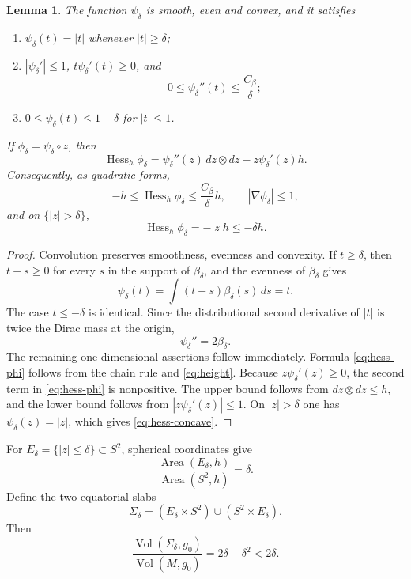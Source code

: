 \documentclass[11pt]{amsart}
\newtheorem{lemma}[theorem]{Lemma}
\theoremstyle{definition}
\newcommand{\Vol}{\operatorname{Vol}}
\newcommand{\Hess}{\operatorname{Hess}}
\begin{document}
\begin{lemma}\label{lem:smoothing}
The function $\psi_\delta$ is smooth, even and convex, and it satisfies
\begin{enumerate}[label=\textup{(\roman*)}]
 \item $\psi_\delta(t)=|t|$ whenever $|t|\ge\delta$;
 \item $|\psi_\delta'|\le1$, $t\psi_\delta'(t)\ge0$, and
 \[
 0\le\psi_\delta''(t)\le\frac{C_\beta}{\delta};
 \]
 \item $0\le\psi_\delta(t)\le1+\delta$ for $|t|\le1$.
\end{enumerate}
If $\phi_\delta=\psi_\delta\circ z$, then
\begin{equation}\label{eq:hess-phi}
 \Hess_h\phi_\delta
 =\psi_\delta''(z)\,dz\otimes dz-z\psi_\delta'(z)h.
\end{equation}
Consequently, as quadratic forms,
\begin{equation}\label{eq:hess-global-bounds}
 -h\le\Hess_h\phi_\delta
 \le\frac{C_\beta}{\delta}h,
 \qquad
 |\nabla\phi_\delta|\le1,
\end{equation}
and on $\{|z|>\delta\}$,
\begin{equation}\label{eq:hess-concave}
 \Hess_h\phi_\delta=-|z|h\le-\delta h.
\end{equation}
\end{lemma}

\begin{proof}
Convolution preserves smoothness, evenness and convexity.  If $t\ge\delta$, then $t-s\ge0$ for every $s$ in the support of $\beta_\delta$, and the evenness of $\beta_\delta$ gives
\[
 \psi_\delta(t)=\int(t-s)\beta_\delta(s)\,ds=t.
\]
The case $t\le-\delta$ is identical.  Since the distributional second derivative of $|t|$ is twice the Dirac mass at the origin,
\[
 \psi_\delta''=2\beta_\delta.
\]
The remaining one-dimensional assertions follow immediately.  Formula
\eqref{eq:hess-phi} follows from the chain rule and \eqref{eq:height}.
Because $z\psi_\delta'(z)\ge0$, the second term in
\eqref{eq:hess-phi} is nonpositive.  The upper bound follows from
$dz\otimes dz\le h$, and the lower bound follows from
$|z\psi_\delta'(z)|\le1$.  On $|z|>\delta$ one has
$\psi_\delta(z)=|z|$, which gives \eqref{eq:hess-concave}.
\end{proof}

For $E_\delta=\{|z|\le\delta\}\subset S^2$, spherical coordinates give
\begin{equation}\label{eq:band-area}
 \frac{\operatorname{Area}(E_\delta,h)}
      {\operatorname{Area}(S^2,h)}=\delta.
\end{equation}
Define the two equatorial slabs
\begin{equation}\label{eq:S0}
 \Sigma_\delta
 =(E_\delta\times S^2)\cup(S^2\times E_\delta).
\end{equation}
Then
\begin{equation}\label{eq:S0-volume}
 \frac{\Vol(\Sigma_\delta,g_0)}{\Vol(M,g_0)}
 =2\delta-\delta^2<2\delta.
\end{equation}
\end{document}
